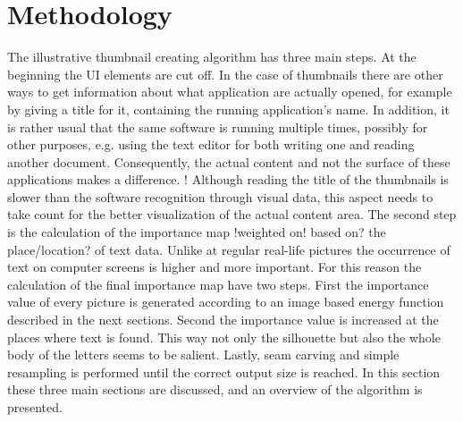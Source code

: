 \documentclass[draft,final]{vutinfth} %
\begin{document}
	\chapter{Methodology}
	The illustrative thumbnail creating algorithm has three main steps.
	At the beginning the UI elements are cut off.
	In the case of thumbnails there are other ways to get information about what application are actually opened, for example by giving a title for it, containing the running application's name.
	In addition, it is rather usual that the same software is running multiple times, possibly for other purposes, e.g. using the text editor for both writing one and reading another document.
	Consequently, the actual content and not the surface of these applications makes a difference.
	! Although reading the title of the thumbnails is slower than the software recognition through visual data, this aspect needs to take count for the better visualization of the actual content area.%
	The second step is the calculation of the importance map !weighted on! based on? the place/location? of text data.
	Unlike at regular real-life pictures the occurrence of text on computer screens is higher and more important.
	For this reason the calculation of the final importance map have two steps.
	First the importance value of every picture is generated according to an image based energy function described in the next sections.
	Second the importance value is increased at the places where text is found.
	This way not only the silhouette but also the whole body of the letters seems to be salient.
	Lastly, seam carving and simple resampling is performed  until the correct output size is reached.
	In this section these three main sections are discussed, and an overview of the algorithm is presented.

	
	
\end{document}
